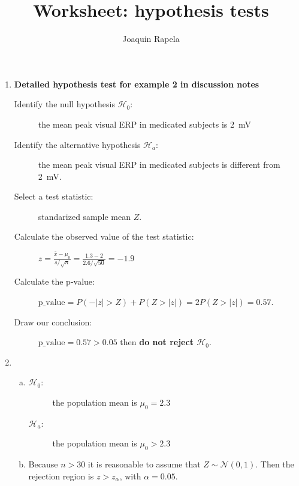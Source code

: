 \documentclass[12pt]{article}
\title{Worksheet: hypothesis tests}
\author{Joaquin Rapela}
\begin{document}
\maketitle

\begin{enumerate}
    \item \textbf{Detailed hypothesis test for example 2 in discussion notes}

        \begin{description}

            \item [Identify the null hypothesis $\mathcal{H}_0$:] the mean peak
                visual ERP in medicated subjects is 2~mV

            \item [Identify the alternative hypothesis $\mathcal{H}_a$:] the
                mean peak visual ERP in medicated subjects is different from
                2~mV.

            \item [Select a test statistic:] standarized sample mean $Z$.

            \item [Calculate the observed value of the test statistic:]
                $z=\frac{\bar{x}-\mu_0}{s/\sqrt{n}}=\frac{1.3-2}{2.6/\sqrt{50}}=-1.9$

            \item [Calculate the p-value:]
                $\text{p\_value}=P(-|z|>Z)+P(Z>|z|)=2 P(Z>|z|)=0.57$.

            \item [Draw our conclusion:] $\text{p\_value}=0.57>0.05$ then
                \textbf{do not reject $\mathcal{H}_0$}.

        \end{description}

    \item 
        \begin{enumerate}[(a)]
            \item
                \begin{description}
                    \item[$\mathcal{H}_0$:] the population mean is $\mu_0=2.3$
                    \item[$\mathcal{H}_a$:] the population mean is $\mu_0>2.3$
                \end{description}

            \item Because $n>30$ it is reasonable to assume that
                $Z\sim\mathcal{N}(0,1)$. Then the rejection region is
                $z>z_\alpha$, with $\alpha=0.05$.


\end{enumerate}
\end{enumerate}
\end{document}
